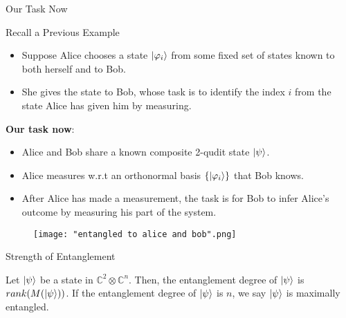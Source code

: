 \documentclass[handout, 10 pt]{beamer}
\begin{document}
\begin{frame}{Our Task Now}

\begin{block}{Recall a Previous Example}
\begin{itemize}
    \item Suppose Alice chooses a state $\ket{\varphi_i}$ from some fixed set of states known to both herself and to Bob.
    \item She gives the state to Bob, whose task is to identify the index $i$ from the state Alice has given him by measuring.
\end{itemize}
\end{block}
\pause

    \textbf{Our task now}: 
    \begin{itemize}
        \item Alice and Bob share a known composite 2-qudit state $\ket{\psi}$.
        \item Alice measures w.r.t an orthonormal basis $\{\ket{\varphi_i}\}$ that Bob knows.
        \item After Alice has made a measurement, the task is for Bob to infer Alice's outcome by measuring his part of the system. 
    \end{itemize}
\begin{figure}[h]
    \centering
    \texttt{[image: "entangled to alice and bob".png]}
\end{figure} 
  
\end{frame}

\begin{frame}{Strength of Entanglement}
\begin{definition} [C., M] \label{def: maximally entangled}
 Let $\ket{\psi}$ be a state in ${\mathbb{C}}^2 \otimes \mathbb{C}^n$.  Then, the entanglement degree of $\ket{\psi}$ is $rank(M(\ket{\psi}))$.  If the entanglement degree of $\ket{\psi}$ is $n$, we say $\ket{\psi}$ is maximally entangled.
\end{definition}
\end{frame}
\end{document}
